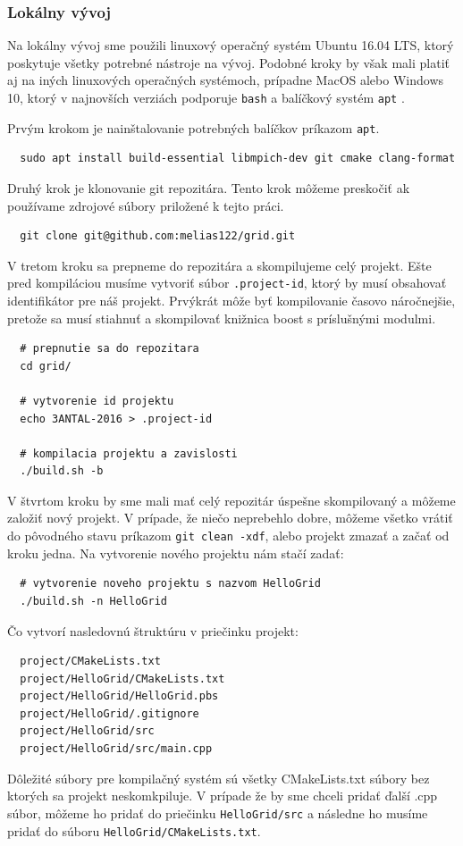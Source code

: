 \subsubsection{Lokálny vývoj}
\label{subsec:local-dev}
Na lokálny vývoj sme použili linuxový operačný systém Ubuntu 16.04 LTS, ktorý poskytuje všetky potrebné nástroje na vývoj.
Podobné kroky by však mali platiť aj na iných linuxových operačných systémoch, prípadne MacOS alebo Windows 10,
ktorý v najnovších verziách podporuje \texttt{bash} a balíčkový systém \texttt{apt} \cite{bash-on-win}.

Prvým krokom je nainštalovanie potrebných balíčkov príkazom \texttt{apt}.
\begin{lstlisting}
  sudo apt install build-essential libmpich-dev git cmake clang-format
\end{lstlisting}
Druhý krok je klonovanie git repozitára. Tento krok môžeme preskočiť ak používame zdrojové súbory priložené k tejto práci.
\begin{lstlisting}
  git clone git@github.com:melias122/grid.git
\end{lstlisting}
V tretom kroku sa prepneme do repozitára a skompilujeme celý projekt.
Ešte pred kompiláciou musíme vytvoriť súbor \texttt{.project-id}, ktorý by musí obsahovať
identifikátor pre náš projekt.
Prvýkrát môže byť kompilovanie časovo náročnejšie,
pretože sa musí stiahnuť a skompilovať knižnica boost s príslušnými modulmi. 
\begin{lstlisting}
  # prepnutie sa do repozitara
  cd grid/

  # vytvorenie id projektu
  echo 3ANTAL-2016 > .project-id

  # kompilacia projektu a zavislosti
  ./build.sh -b
\end{lstlisting}
V štvrtom kroku by sme mali mať celý repozitár úspešne skompilovaný a môžeme založiť nový projekt.
V prípade, že niečo neprebehlo dobre, môžeme všetko vrátiť do pôvodného stavu príkazom \texttt{git clean -xdf}, alebo projekt zmazať a začať od kroku jedna.
Na vytvorenie nového projektu nám stačí zadať:
\begin{lstlisting}
  # vytvorenie noveho projektu s nazvom HelloGrid
  ./build.sh -n HelloGrid
\end{lstlisting}
Čo vytvorí nasledovnú štruktúru v priečinku projekt:
\begin{lstlisting}
  project/CMakeLists.txt
  project/HelloGrid/CMakeLists.txt
  project/HelloGrid/HelloGrid.pbs
  project/HelloGrid/.gitignore
  project/HelloGrid/src
  project/HelloGrid/src/main.cpp
\end{lstlisting}
Dôležité súbory pre kompilačný systém sú všetky CMakeLists.txt súbory bez ktorých sa projekt neskomkpiluje.
V prípade že by sme chceli pridať ďalší .cpp súbor, môžeme ho pridať do priečinku \texttt{HelloGrid/src} a následne ho musíme pridať do
súboru \texttt{HelloGrid/CMakeLists.txt}.


